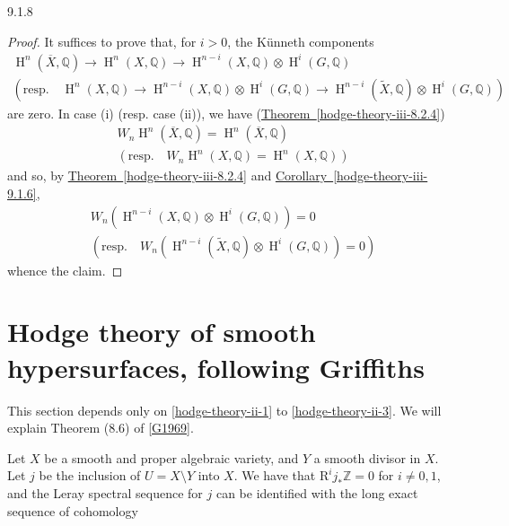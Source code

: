 \begin{variant}{9.1.8}
\begin{enumerate}
    \end{enumerate}\begin{proof}\par{}It suffices to prove that, for \(i>0\), the Künneth components
      \[         \begin {gathered}           \operatorname {H}^n(\overline {X},\mathbb {Q})           \to  \operatorname {H}^n(X,\mathbb {Q})           \to  \operatorname {H}^{n-i}(X,\mathbb {Q})\otimes \operatorname {H}^i(G,\mathbb {Q})         \\(\text {resp.}\quad            \operatorname {H}^n(X,\mathbb {Q})           \to  \operatorname {H}^{n-i}(X,\mathbb {Q})\otimes \operatorname {H}^i(G,\mathbb {Q})           \to  \operatorname {H}^{n-i}(\widetilde {X},\mathbb {Q})\otimes \operatorname {H}^i(G,\mathbb {Q})           )         \end {gathered}       \]
      are zero.
      In case (i) (resp. case (ii)), we have (\hyperref[hodge-theory-iii-8.2.4]{Theorem~\ref*{hodge-theory-iii-8.2.4}})
      \[         \begin {gathered}           W_n\operatorname {H}^n(\overline {X},\mathbb {Q})           = \operatorname {H}^n(\overline {X},\mathbb {Q})         \\(\text {resp.}\quad            W_n\operatorname {H}^n(X,\mathbb {Q})           = \operatorname {H}^n(X,\mathbb {Q})           )         \end {gathered}       \]
      and so, by \hyperref[hodge-theory-iii-8.2.4]{Theorem~\ref*{hodge-theory-iii-8.2.4}} and \hyperref[hodge-theory-iii-9.1.6]{Corollary~\ref*{hodge-theory-iii-9.1.6}},
      \[         \begin {gathered}           W_n(\operatorname {H}^{n-i}(X,\mathbb {Q})\otimes \operatorname {H}^i(G,\mathbb {Q}))           = 0         \\(\text {resp.}\quad            W_n(\operatorname {H}^{n-i}(\widetilde {X},\mathbb {Q})\otimes \operatorname {H}^i(G,\mathbb {Q}))           = 0           )         \end {gathered}       \]
      whence the claim.\end{proof}\end{variant}\section{Hodge theory of smooth hypersurfaces, following Griffiths}\label{hodge-theory-iii-9.2}\par{}This section depends only on \cref{hodge-theory-ii-1} to \cref{hodge-theory-ii-3}.
  We will explain Theorem (8.6) of \hyperref[G1969]{[G1969]}.\label{hodge-theory-iii-9.2.1}\par{}Let \(X\) be a smooth and proper algebraic variety, and \(Y\) a smooth divisor in \(X\).
    Let \(j\) be the inclusion of \(U=X\setminus  Y\) into \(X\).
    We have that \(\mathrm {R}^i j_*\mathbb {Z}=0\) for \(i\neq 0,1\), and the Leray spectral sequence for \(j\) can be identified with the long exact sequence of cohomology

